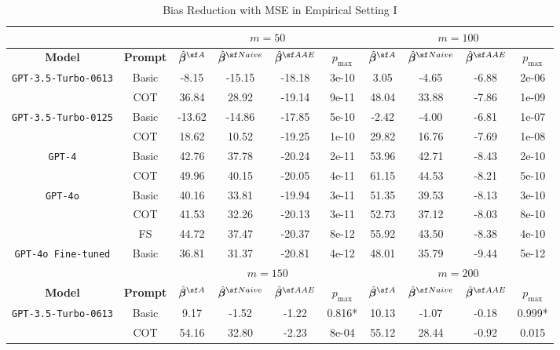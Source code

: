 \begin{table}[!ht]
\renewcommand{\arraystretch}{1.3}
\centering
{\footnotesize
\caption{Bias Reduction with MSE in Empirical Setting I}
\label{tab:bias-reduction-mse}
\begin{tabular}{cccccccccc}\hline\hline
& & \multicolumn{4}{c}{$m=50$} & \multicolumn{4}{c}{$m=100$} \\\hline
\textbf{Model}  & \textbf{Prompt} & $\hat{\betavec}^{\sf A}$ & $\hat{\betavec}^{\sf Naive}$  & $\hat{\betavec}^{\sf AAE}$  & $p_{\max}$ & $\hat{\betavec}^{\sf A}$& $\hat{\betavec}^{\sf Naive}$  & $\hat{\betavec}^{\sf AAE}$   & $p_{\max}$ \\\hline
\multirow{2}{*}{\texttt{GPT-3.5-Turbo-0613}} & Basic & -8.15 & -15.15 & -18.18 & 3e-10 & 3.05 & -4.65 & -6.88 & 2e-06 \\
 & COT & 36.84 & 28.92 & -19.14 & 9e-11 & 48.04 & 33.88 & -7.86 & 1e-09 \\
\multirow{2}{*}{\texttt{GPT-3.5-Turbo-0125}} & Basic & -13.62 & -14.86 & -17.85 & 5e-10 & -2.42 & -4.00 & -6.81 & 1e-07 \\
 & COT & 18.62 & 10.52 & -19.25 & 1e-10 & 29.82 & 16.76 & -7.69 & 1e-08 \\
\multirow{2}{*}{\texttt{GPT-4}} & Basic & 42.76 & 37.78 & -20.24 & 2e-11 & 53.96 & 42.71 & -8.43 & 2e-10 \\
 & COT & 49.96 & 40.15 & -20.05 & 4e-11 & 61.15 & 44.53 & -8.21 & 5e-10 \\
\multirow{3}{*}{\texttt{GPT-4o}} & Basic & 40.16 & 33.81 & -19.94 & 3e-11 & 51.35 & 39.53 & -8.13 & 3e-10 \\
 & COT & 41.53 & 32.26 & -20.13 & 3e-11 & 52.73 & 37.12 & -8.03 & 8e-10 \\
 & FS & 44.72 & 37.47 & -20.37 & 8e-12 & 55.92 & 43.50 & -8.38 & 4e-10 \\
\texttt{GPT-4o Fine-tuned} & Basic & 36.81 & 31.37 & -20.81 & 4e-12 & 48.01 & 35.79 & -9.44 & 5e-12 \\\hline
& & \multicolumn{4}{c}{$m=150$} & \multicolumn{4}{c}{$m=200$} \\\hline
\textbf{Model}  & \textbf{Prompt} & $\hat{\betavec}^{\sf A}$& $\hat{\betavec}^{\sf Naive}$  & $\hat{\betavec}^{\sf AAE}$   & $p_{\max}$ & $\hat{\betavec}^{\sf A}$& $\hat{\betavec}^{\sf Naive}$  & $\hat{\betavec}^{\sf AAE}$   & $p_{\max}$ \\\hline
\multirow{2}{*}{\texttt{GPT-3.5-Turbo-0613}} & Basic & 9.17 & -1.52 & -1.22 & 0.816* & 10.13 & -1.07 & -0.18 & 0.999* \\
 & COT & 54.16 & 32.80 & -2.23 & 8e-04 & 55.12 & 28.44 & -0.92 & 0.015 \\

\end{tabular}}
\end{table}
